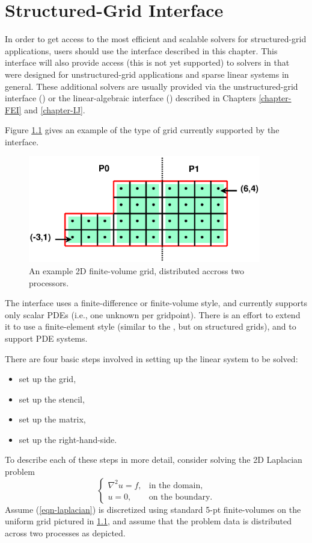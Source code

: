 \chapter{Structured-Grid Interface}
\label{Structured-Grid Interface}

In order to get access to the most efficient and scalable solvers for
structured-grid applications, users should use the 
interface described in this chapter.  This interface will also provide
access (this is not yet supported) to solvers in \hypre{} that were
designed for unstructured-grid applications and sparse linear systems
in general.  These additional solvers are usually provided via the
unstructured-grid interface () or the linear-algebraic
interface () described in Chapters \ref{chapter-FEI} and
\ref{chapter-IJ}.

Figure \ref{fig-fv-grid} gives an example of the type of grid
currently supported by the  interface.
\begin{figure}
\centering
\includegraphics[width=4in]{fv_grid.eps}
\caption{%
An example 2D finite-volume grid, distributed accross two processors.}
\label{fig-fv-grid}
\end{figure}
The interface uses a finite-difference or finite-volume style, and
currently supports only scalar PDEs (i.e., one unknown per gridpoint).
There is an effort to extend it to use a finite-element style (similar
to the , but on structured grids), and to support PDE systems.

There are four basic steps involved in setting up the linear system
to be solved:
\begin{itemize}
\item set up the grid,
\item set up the stencil,
\item set up the matrix,
\item set up the right-hand-side.
\end{itemize}
To describe each of these steps in more detail, consider solving the
2D Laplacian problem
\begin{equation}\label{eqn-laplacian}
\left \{
\begin{array}{ll}
\nabla^2 u = f , & \mbox{in the domain}, \\
u = 0,           & \mbox{on the boundary}.
\end{array}
\right .
\end{equation}
Assume (\ref{eqn-laplacian}) is discretized using standard 5-pt
finite-volumes on the uniform grid pictured in \ref{fig-fv-grid}, and
assume that the problem data is distributed across two processes as
depicted.

